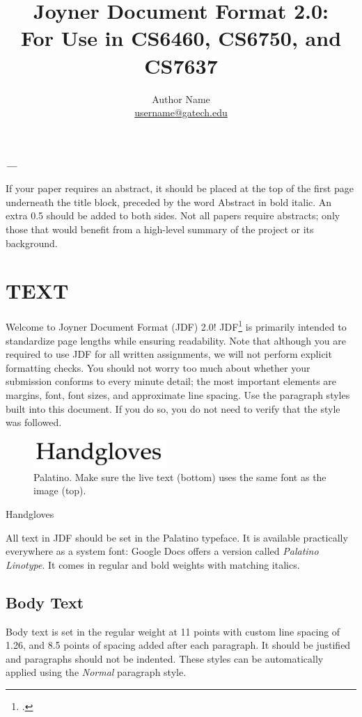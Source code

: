 \documentclass[11pt,a4paper,usenames,dvipsnames]{article}
\title{\LARGE \textbf{Joyner Document Format 2.0:\\
For Use in CS6460, CS6750, and CS7637
} }
\author{Author Name \\ \href{mailto:username@gatech.edu}{username@gatech.edu}}
\date{}
\renewenvironment{abstract}{%
  \list{}{\leftmargin0.5in \rightmargin\leftmargin}
  \item\relax
   \par{\bfseries \noindent \textit{\abstractname—}\nolinebreak} 
}{%
  \endlist \par
}
\begin{document}
\clearpage\maketitle
\maketitle              %
%
\begin{abstract}
If your paper requires an abstract, it should be placed at the top of the first page underneath the title block, preceded by the word Abstract in bold italic. An extra 0.5 should be added to both sides. Not all papers require abstracts; only those that would benefit from a high-level summary of the project or its background.
\end{abstract}

\section{TEXT}
Welcome to Joyner Document Format (JDF) 2.0! JDF\footcite{nonon2019} is primarily intended to standardize page lengths while ensuring readability. Note that although you are required to use JDF for all written assignments, we will not perform explicit formatting checks. You should not worry too much about whether your submission conforms to every minute detail; the most important elements are margins, font, font sizes, and approximate line spacing. Use the paragraph styles built into this document. If you do so, you do not need to verify that the style was followed.
\begin{figure}[H]
\centering
\includegraphics[width=0.45\textwidth]{palantino.png}
\caption{\label{fig:pie} Palatino. Make sure the live text (bottom) uses the same font as the image (top).}
\end{figure}
\begin{center}
{\fontsize{30}{30}\selectfont Handgloves}
\end{center}

All text in JDF should be set in the Palatino typeface. It is available practically everywhere as a system font: Google Docs offers a version called \textit{Palatino Linotype}. It comes in regular and bold weights with matching italics.

\subsection{Body Text}
Body text is set in the regular weight at 11 points with custom line spacing of 1.26, and 8.5 points of spacing added after each paragraph. It should be justified and paragraphs should not be indented. These styles can be automatically applied using the \textit{Normal} paragraph style.
\end{document}
